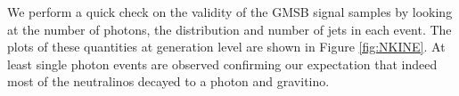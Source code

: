 \vspace{5mm} 
  We perform a quick check on the validity of the GMSB signal samples by looking at the number of photons, the \MET distribution and number of jets in each event. 
The plots of these quantities at generation level are shown in Figure \ref{fig:NKINE}. At least single photon events are observed confirming our expectation that indeed most of the neutralinos decayed to a photon and gravitino.
\newline
